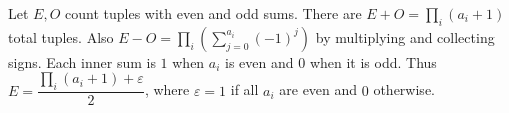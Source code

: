 Let $E,O$ count tuples with even and odd sums. There are $E+O=\prod_i(a_i+1)$ total tuples. Also $E-O=\prod_i\left(\sum_{j=0}^{a_i}(-1)^j\right)$ by multiplying and collecting signs. Each inner sum is $1$ when $a_i$ is even and $0$ when it is odd. Thus $\boxed{E=\dfrac{\prod_i(a_i+1)+\varepsilon}{2}}$, where $\varepsilon=1$ if all $a_i$ are even and $0$ otherwise.
